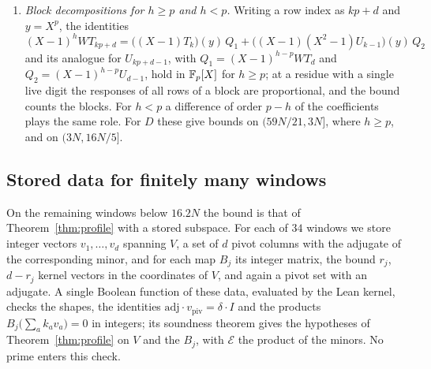 \begin{enumerate}[label=(\roman*),wide]
fixed integer, the modulus of the cell, and the bound is the dimension of the slot space minus the number of
conditions. In the families C and $\mathrm C'$ the responses depend only on the residue of the column modulo
$p$, so that the filter costs $(p-q)_+$ conditions; in $\mathrm C'$, where $h\ge p$, one writes
$(X-1)^h=(X^p-1)(X-1)^{h-p}$, and the factor $(X-1)^{h-p}$ costs $h-p$ more. The family C gives bounds on $(58N/17,59N/17]$ and
$(29N/8,11N/3]$, and $\mathrm C'$ on $(16N/7,5N/2]$.
\item \emph{Block decompositions for $h\ge p$ and $h<p$.} Writing a row index as $kp+d$ and $y=X^p$, the
identities
\[
 (X-1)^hWT_{kp+d}=\bigl((X-1)T_k\bigr)(y)\,Q_1+\bigl((X-1)(X^2-1)U_{k-1}\bigr)(y)\,Q_2
\]
and its analogue for $U_{kp+d-1}$, with $Q_1=(X-1)^{h-p}WT_d$ and $Q_2=(X-1)^{h-p}U_{d-1}$, hold in $\mathbb F_p[X]$ for
$h\ge p$; at a residue with a single live digit the responses of all rows of a block are proportional, and the
bound counts the blocks. For $h<p$ a difference of order $p-h$ of the coefficients plays the same role.
For $D$ these give bounds on $(59N/21,3N]$, where $h\ge p$, and on $(3N,16N/5]$.
\end{enumerate}

\subsection{Stored data for finitely many windows}\label{ssec:packets}
On the remaining windows below $16.2N$ the bound is that of Theorem~\ref{thm:profile} with a stored
subspace. For each of $34$ windows we store integer vectors $v_1,\dots,v_d$ spanning $V$, a set of $d$ pivot
columns with the adjugate of the corresponding minor, and for each map $B_j$ its integer matrix, the bound
$r_j$, $d-r_j$ kernel vectors in the coordinates of $V$, and again a pivot set with an adjugate. A single
Boolean function of these data, evaluated by the Lean kernel, checks the shapes, the identities
$\mathrm{adj}\cdot v_{\mathrm{piv}}=\delta\cdot I$ and the products $B_j\bigl(\sum_ak_av_a\bigr)=0$ in
integers; its soundness theorem gives the hypotheses of Theorem~\ref{thm:profile} on $V$ and the $B_j$, with
$\mathcal E$ the product of the minors. No prime enters this check.


